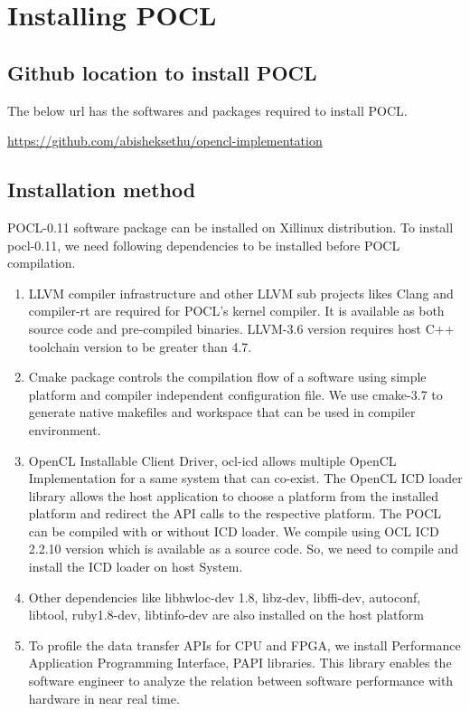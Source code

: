 \section{Installing POCL}
\subsection{Github location to install POCL}
The below url has the softwares and packages required to install POCL.

\url{https://github.com/abisheksethu/opencl-implementation}

\subsection{Installation method}
POCL-0.11 software package can be installed on Xillinux distribution. To install pocl-0.11, we need following dependencies to be installed before POCL compilation. 
\begin{enumerate}
	\item LLVM compiler infrastructure and other LLVM sub projects likes Clang and compiler-rt are required for POCL’s kernel compiler. It is available as both source code and pre-compiled binaries. LLVM-3.6 version requires host C++ toolchain version to be greater than 4.7. 
	\item Cmake package controls the compilation flow of a software using simple platform and compiler independent configuration file. We use cmake-3.7 to generate native makefiles and workspace that can be used in compiler environment. 
	\item OpenCL Installable Client Driver, ocl-icd allows multiple OpenCL Implementation for a same system that can co-exist. The OpenCL ICD loader library allows the host application to choose a platform from the installed platform and redirect the API calls to the respective platform. The POCL can be compiled with or without ICD loader. We compile using OCL ICD 2.2.10 version which is available as a source code. So, we need to compile and install the ICD loader on host System.
	\item Other dependencies like libhwloc-dev 1.8, libz-dev, libffi-dev, autoconf, libtool, ruby1.8-dev, libtinfo-dev are also installed on the host platform
	\item To profile the data transfer APIs for CPU and FPGA, we install Performance Application Programming Interface, PAPI libraries. This library 	enables the software engineer to analyze the relation between software performance with hardware in near real time.
\end{enumerate}


